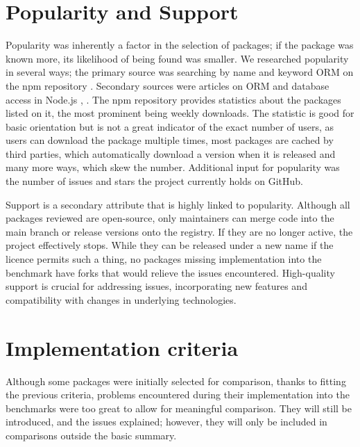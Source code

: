 \section{Popularity and Support}
Popularity was inherently a factor in the selection of packages; if the package
was known more, its likelihood of being found was smaller. We researched
popularity in several ways; the primary source was searching by name and keyword
ORM on the npm repository \cite{npmSearchORM}. Secondary sources were articles on
ORM and database access in Node.js \cite{SitePoint_2021}, \cite{Wang_2020}. The npm
repository provides statistics about the packages listed on it, the most
prominent being weekly downloads. The statistic is good for basic orientation
but is not a great indicator of the exact number of users, as users can download
the package multiple times, most packages are cached by third parties, which
automatically download a version when it is released and many more ways, which
skew the number. Additional input for popularity was the number of issues and
stars the project currently holds on GitHub.

Support is a secondary attribute that is highly linked to popularity. Although
all packages reviewed are open-source, only maintainers can merge code into the
main branch or release versions onto the registry. If they are no longer active,
the project effectively stops. While they can be released under a new name if
the licence permits such a thing, no packages missing implementation into the
benchmark have forks that would relieve the issues encountered. High-quality
support is crucial for addressing issues, incorporating new features and
compatibility with changes in underlying technologies.

\section{Implementation criteria}
Although some packages were initially selected for comparison, thanks to fitting
the previous criteria, problems encountered during their implementation into the
benchmarks were too great to allow for meaningful comparison. They will still be
introduced, and the issues explained; however, they will only be included in
comparisons outside the basic summary.
